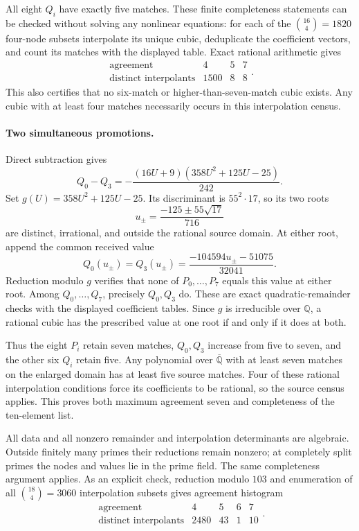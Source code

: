 \documentclass[10pt]{article}
\begin{document}
All eight $Q_i$ have exactly five matches. These finite completeness statements can be checked without solving any nonlinear equations: for each of the $\binom{16}{4}=1820$ four-node subsets interpolate its unique cubic, deduplicate the coefficient vectors, and count its matches with the displayed table. Exact rational arithmetic gives
\[
\begin{array}{c|rrr}\text{agreement}&4&5&7\\\hline
\text{distinct interpolants}&1500&8&8\end{array}.
\]
This also certifies that no six-match or higher-than-seven-match cubic exists. Any cubic with at least four matches necessarily occurs in this interpolation census.

\paragraph{Two simultaneous promotions.}
Direct subtraction gives
\[
Q_0-Q_3=-\frac{(16U+9)(358U^2+125U-25)}{242}.
\]
Set $g(U)=358U^2+125U-25$. Its discriminant is $55^2\cdot17$, so its two roots
\[
u_\pm=\frac{-125\pm55\sqrt{17}}{716}
\]
are distinct, irrational, and outside the rational source domain. At either root, append the common received value
\[
Q_0(u_\pm)=Q_3(u_\pm)
=\frac{-104594u_\pm-51075}{32041}.
\]
Reduction modulo $g$ verifies that none of $P_0,\ldots,P_7$ equals this value at either root. Among $Q_0,\ldots,Q_7$, precisely $Q_0,Q_3$ do. These are exact quadratic-remainder checks with the displayed coefficient tables. Since $g$ is irreducible over $\mathbb Q$, a rational cubic has the prescribed value at one root if and only if it does at both.

Thus the eight $P_i$ retain seven matches, $Q_0,Q_3$ increase from five to seven, and the other six $Q_i$ retain five. Any polynomial over $\overline{\mathbb Q}$ with at least seven matches on the enlarged domain has at least five source matches. Four of these rational interpolation conditions force its coefficients to be rational, so the source census applies. This proves both maximum agreement seven and completeness of the ten-element list.

All data and all nonzero remainder and interpolation determinants are algebraic. Outside finitely many primes their reductions remain nonzero; at completely split primes the nodes and values lie in the prime field. The same completeness argument applies. As an explicit check, reduction modulo $103$ and enumeration of all $\binom{18}{4}=3060$ interpolation subsets gives agreement histogram
\[
\begin{array}{c|rrrr}\text{agreement}&4&5&6&7\\\hline
\text{distinct interpolants}&2480&43&1&10\end{array}.
\]
\end{document}
